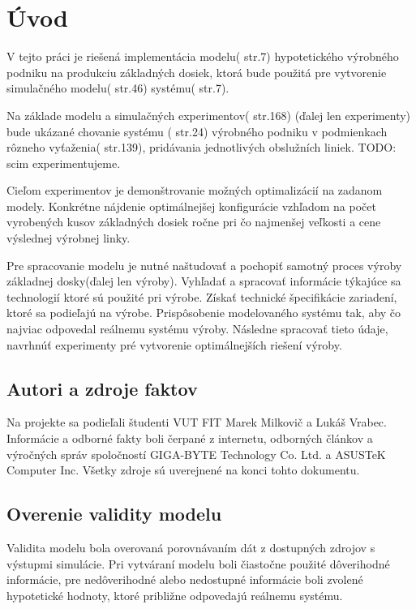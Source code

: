 \documentclass[12pt,a4paper,titlepage,final]{article}
\begin{document}
\newpage
\pagestyle{plain}
\setcounter{page}{1}

\section{Úvod}
V tejto práci je riešená implementácia modelu(\cite{peringer-slidy} str.7) hypotetického
výrobného podniku na produkciu základných dosiek, ktorá bude použitá pre 
vytvorenie simulačného modelu(\cite{peringer-slidy} str.46) systému(\cite{peringer-slidy} str.7).

Na základe modelu a simulačných experimentov(\cite{peringer-slidy} str.168)
(ďalej len experimenty) bude ukázané chovanie systému (\cite{peringer-slidy} str.24)
výrobného podniku v podmienkach rôzneho vyťaženia(\cite{peringer-slidy} str.139),
pridávania jednotlivých obslužních liniek.
TODO: scim experimentujeme. 

Cieľom experimentov je demonštrovanie možných optimalizácií na zadanom modely. Kon\-kré\-tne
nájdenie optimálnejšej konfigurácie vzhľadom na počet vyrobených
kusov základných dosiek ročne pri čo najmenšej veľkosti a cene výslednej 
výrobnej linky.

Pre spracovanie modelu je nutné naštudovať a pochopiť samotný proces výroby
základnej dosky(ďalej len výroby). Vyhľadať a spracovať informácie týkajúce sa 
technologií ktoré sú použité pri výrobe. Získať technické špecifikácie zariadení,
ktoré sa podieľajú na výrobe. Pri\-spô\-so\-be\-nie modelovaného systému tak,
aby čo najviac odpovedal reálnemu
systému výroby. Následne spracovať tieto údaje, navrhnúť experimenty pré 
vytvorenie optimálnejších riešení výroby. 

\subsection{Autori a zdroje faktov}
Na projekte sa podieľali študenti VUT FIT Marek Milkovič a Lukáš Vrabec. Informácie
a odborné fakty boli čerpané z internetu, odborných článkov a výročných
správ spoločností GIGA-BYTE Technology Co. Ltd. a ASUSTeK Computer Inc.
Všetky zdroje sú uverejnené na konci tohto dokumentu.

\subsection{Overenie validity modelu}
Validita modelu bola overovaná porovnávaním dát z dostupných zdrojov s výstupmi
simulácie. Pri vytváraní modelu boli čiastočne použité dôverihodné informácie,
pre nedôverihodné alebo nedostupné informácie boli zvolené hypotetické hodnoty,
ktoré približne odpovedajú reálnemu systému. 
\end{document}
